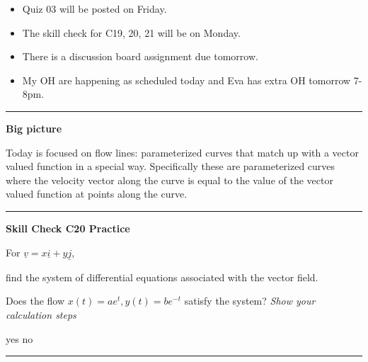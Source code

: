 \documentclass[12pt,letterpaper,noanswers]{exam}
\newcommand{\mb}[1]{\underline{#1}}
\begin{document}
 \pdfpageheight 11in 
  \pdfpagewidth 8.5in





\begin{itemize}
\itemsep0em
    \item Quiz 03 will be posted on Friday.
    \item The skill check for C19, 20, 21 will be on Monday.
    \item There is a discussion board assignment due tomorrow.
    \item My OH are happening as scheduled today and Eva has extra OH tomorrow 7-8pm.
\end{itemize}

\hrule
\vspace{0.2cm}

\noindent\textbf{Big picture}

Today is focused on flow lines: parameterized curves that match up with a vector valued function in a special way.  Specifically these are parameterized curves where the velocity vector along the curve is equal to the value of the vector valued function at points along the curve.

\vspace{0.2cm}
\hrule
\vspace{0.2cm}



\noindent\textbf{Skill Check C20 Practice}
\begin{questions}
\question For $\mb v = x\mb i + y\mb j$,
\begin{parts}
\item find the system of differential equations associated with the vector field.
\item Does the flow $x(t) = ae^t, y(t) = be^{-t}$ satisfy the system?  \emph{Show your calculation steps}

\begin{oneparcheckboxes}
\choice yes
\choice no
\end{oneparcheckboxes}
\end{parts}
\end{questions}


\vspace{0.2cm}
\hrule
\vspace{0.2cm}
\end{document}
